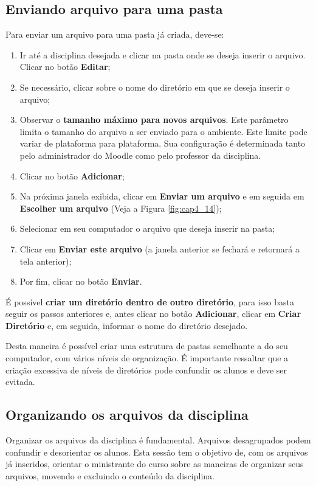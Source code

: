 \subsection{Enviando arquivo para uma pasta}
Para enviar um arquivo para uma pasta já criada, deve-se:
\begin{enumerate}
\item Ir até a disciplina desejada e clicar na pasta onde se deseja inserir o arquivo. Clicar no botão \textbf{Editar};
\item Se necessário, clicar sobre o nome do diretório em que se deseja inserir o arquivo;
\item Observar o \textbf{tamanho máximo para novos arquivos}. Este parâmetro limita o tamanho do arquivo a ser enviado para o ambiente. Este limite pode variar de plataforma para plataforma. Sua configuração é determinada tanto pelo administrador do Moodle como pelo professor da disciplina.
\item Clicar no botão \textbf{Adicionar};
\item Na próxima janela exibida, clicar em \textbf{Enviar um arquivo} e em seguida em \textbf{Escolher um arquivo} (Veja a Figura \ref{fig:cap4_14});
\item Selecionar em seu computador o arquivo que deseja inserir na pasta;
\item Clicar em \textbf{Enviar este arquivo} (a janela anterior se fechará e retornará a tela anterior);
\item Por fim, clicar no botão \textbf{Enviar}.

\end{enumerate}
É possível \textbf{criar um diretório dentro de outro diretório}, para isso basta seguir os passos anteriores e, antes clicar no botão \textbf{Adicionar}, clicar em \textbf{Criar Diretório} e, em seguida, informar o nome do diretório desejado.

Desta maneira é possível criar uma estrutura de pastas semelhante a do seu computador, com vários níveis de organização. É importante ressaltar que a criação excessiva de níveis de diretórios pode confundir os alunos e deve ser evitada.

\subsection{Organizando os arquivos da disciplina}
Organizar os arquivos da disciplina é fundamental. Arquivos desagrupados podem confundir e desorientar os alunos.
Esta sessão tem o objetivo de, com os arquivos já inseridos, orientar o ministrante do curso sobre as maneiras de 
organizar seus arquivos, movendo e excluindo o conteúdo da disciplina.

